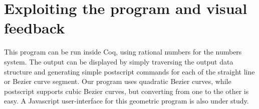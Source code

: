 \documentclass{easychair}
\begin{document}
\section{Exploiting the program and visual feedback}
This program can be run inside Coq, using rational numbers for the numbers system.
The output can be displayed by simply traversing the output data structure and generating
simple postscript commands for each of the straight line or Bezier curve segment.  Our
program uses quadratic Bezier curves, while postscript supports cubic Bezier curves, but
converting from one to the other is easy.  A Javascript user-interface for this geometric
program is also under study.
\end{document}
